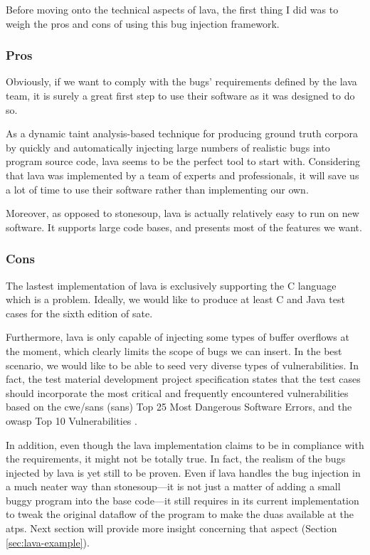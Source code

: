 Before moving onto the technical aspects of \gls{lava}, the first thing I did was to weigh the pros and cons of using this bug injection framework.

\subsubsection{Pros}

Obviously, if we want to comply with the bugs' requirements defined by the \gls{lava} team, it is surely a great first step to use their software as it was designed to do so.

As a dynamic taint analysis-based technique for producing ground truth corpora by quickly and automatically injecting large numbers of realistic bugs into program source code, \gls{lava} seems to be the perfect tool to start with. Considering that \gls{lava} was implemented by a team of experts and professionals, it will save us a lot of time to use their software rather than implementing our own.

Moreover, as opposed to \gls{stonesoup}, \gls{lava} is actually relatively easy to run on new software. It supports large code bases, and presents most of the features we want.

\subsubsection{Cons}

The lastest implementation of \gls{lava} is exclusively supporting the C language which is a problem. Ideally, we would like to produce at least C and Java test cases for the sixth edition of \gls{sate}.

Furthermore, \gls{lava} is only capable of injecting some types of buffer overflows at the moment, which clearly limits the scope of bugs we can insert. In the best scenario, we would like to be able to seed very diverse types of vulnerabilities. In fact, the test material development project specification states that the test cases should incorporate the most critical and frequently encountered vulnerabilities based on the \gls{cwe}/\acrshort{sans} (\acrlong{sans}) Top 25 Most Dangerous Software Errors, and the \gls{owasp} Top 10 Vulnerabilities \cite{owasp2016top}.

In addition, even though the \gls{lava} implementation claims to be in compliance with the requirements, it might not be totally true. In fact, the realism of the bugs injected by \gls{lava} is yet still to be proven. Even if \gls{lava} handles the bug injection in a much neater way than \gls{stonesoup}---it is not just a matter of adding a small buggy program into the base code---it still requires in its current implementation to tweak the original dataflow of the program to make the \glspl{dua} available at the \glspl{atp}. Next section will provide more insight concerning that aspect (Section \ref{sec:lava-example}).

